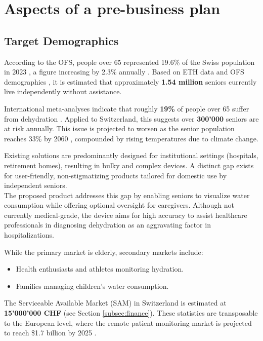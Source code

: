\documentclass{article}
\begin{document}
\section{Aspects of a pre-business plan }
\subsection{Target Demographics}
According to the OFS, people over 65 represented 19.6\% of the Swiss population in 2023 \cite{age}, a figure increasing by 2.3\% annually \cite{swissinfo}. Based on ETH data \cite{ETH} and OFS demographics \cite{OFS}, it is estimated that approximately \textbf{1.54 million} seniors currently live independently without assistance.

International meta-analyses indicate that roughly \textbf{19\%} of people over 65 suffer from dehydration \cite{PubMed}. Applied to Switzerland, this suggests over \textbf{300'000} seniors are at risk annually. This issue is projected to worsen as the senior population reaches 33\% by 2060 \cite{OFS_oldpop}, compounded by rising temperatures due to climate change.

Existing solutions are predominantly designed for institutional settings (hospitals, retirement homes), resulting in bulky and complex devices. A distinct gap exists for user-friendly, non-stigmatizing products tailored for domestic use by independent seniors.\\

The proposed product addresses this gap by enabling seniors to visualize water consumption while offering optional oversight for caregivers. Although not currently medical-grade, the device aims for high accuracy to assist healthcare professionals in diagnosing dehydration as an aggravating factor in hospitalizations.

While the primary market is elderly, secondary markets include:
\begin{itemize}
    \item Health enthusiasts and athletes monitoring hydration.
    \item Families managing children's water consumption.
\end{itemize}

The Serviceable Available Market (SAM) in Switzerland is estimated at \textbf{15'000'000 CHF} (see Section \ref{subsec:finance}). These statistics are transposable to the European level, where the remote patient monitoring market is projected to reach \$1.7 billion by 2025 \cite{EuropeanMarket}.
\end{document}

